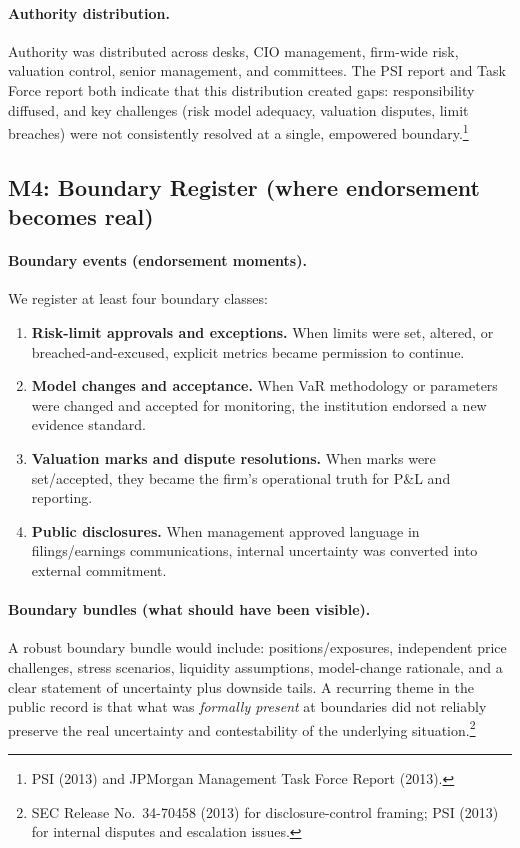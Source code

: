 \paragraph{Authority distribution.}
Authority was distributed across desks, CIO management, firm-wide risk, valuation control, senior management, and committees. The PSI report and Task Force report both indicate that this distribution created gaps: responsibility diffused, and key challenges (risk model adequacy, valuation disputes, limit breaches) were not consistently resolved at a single, empowered boundary.\footnote{PSI (2013) and JPMorgan Management Task Force Report (2013).}

\subsection{M4: Boundary Register (where endorsement becomes real)}
\label{subsec:lw-m4}

\paragraph{Boundary events (endorsement moments).}
We register at least four boundary classes:

\begin{enumerate}
\item \textbf{Risk-limit approvals and exceptions.} When limits were set, altered, or breached-and-excused, explicit metrics became permission to continue.
\item \textbf{Model changes and acceptance.} When VaR methodology or parameters were changed and accepted for monitoring, the institution endorsed a new evidence standard.
\item \textbf{Valuation marks and dispute resolutions.} When marks were set/accepted, they became the firm’s operational truth for P\&L and reporting.
\item \textbf{Public disclosures.} When management approved language in filings/earnings communications, internal uncertainty was converted into external commitment.
\end{enumerate}

\paragraph{Boundary bundles (what should have been visible).}
A robust boundary bundle would include: positions/exposures, independent price challenges, stress scenarios, liquidity assumptions, model-change rationale, and a clear statement of uncertainty plus downside tails. A recurring theme in the public record is that what was \emph{formally present} at boundaries did not reliably preserve the real uncertainty and contestability of the underlying situation.\footnote{SEC Release No.\ 34-70458 (2013) for disclosure-control framing; PSI (2013) for internal disputes and escalation issues.}


